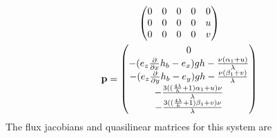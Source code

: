 \begin{gather}
\begin{pmatrix}
      0 & 0 & 0 & 0 & 0 \\
      0 & 0 & 0 & 0 & u \\
      0 & 0 & 0 & 0 & v
    \end{pmatrix} \\
    \mathbf{p} =
    \begin{pmatrix}
      0 \\
      -{(e_{z} \frac{\partial}{\partial x}h_{b} - e_{x})} g h - \frac{\nu {(\alpha_{1} + u)}}{\lambda} \\
      -{(e_{z} \frac{\partial}{\partial y}h_{b} - e_{y})} g h - \frac{\nu {(\beta_{1} + v)}}{\lambda} \\
      -\frac{3 {({(\frac{4 \lambda}{h} + 1)} \alpha_{1} + u)} \nu}{\lambda} \\
      -\frac{3 {({(\frac{4 \lambda}{h} + 1)} \beta_{1} + v)} \nu}{\lambda}
    \end{pmatrix}
  \end{gather}
  The flux jacobians and quasilinear matrices for this system are
